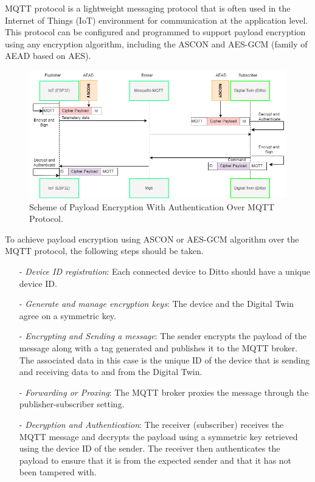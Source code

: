 MQTT protocol is a lightweight messaging protocol that is often used in the Internet of Things (IoT) environment for communication at the application level. This protocol can be configured and programmed to support payload encryption using any encryption algorithm, including the ASCON and AES-GCM (family of AEAD based on AES). 

\begin{figure}[H]
   
    \centering
    \includegraphics[width=\textwidth]{images/fp/payloadenc.drawio.png}
     \caption{Scheme of Payload Encryption With Authentication Over MQTT Protocol. }
    \label{fig:payload-encauth-schem}
\end{figure}

To achieve payload encryption using ASCON or AES-GCM algorithm over the MQTT protocol, the following steps should be taken. 
\begin{itemize}
    \item[-] \textit{Device ID registration}: Each connected device to Ditto should have a unique device ID. 
    \item[-] \textit{Generate and manage encryption keys}: The device and the Digital Twin agree on a symmetric key. 
    \item[-] \textit{Encrypting and Sending a message}: The sender encrypts the payload of the message along with a tag generated and publishes it to the MQTT broker. The associated data in this case is the unique ID of the device that is sending and receiving data to and from the Digital Twin. 
    \item[-] \textit{Forwarding or Proxing}: The MQTT broker proxies the message through the publisher-subscriber setting. 
    \item[-] \textit{Decryption and Authentication}: The receiver (subscriber) receives the MQTT message and decrypts the payload using a symmetric key retrieved using the device ID of the sender. The receiver then authenticates the payload to ensure that it is from the expected sender and that it has not been tampered with.
    
\end{itemize}


